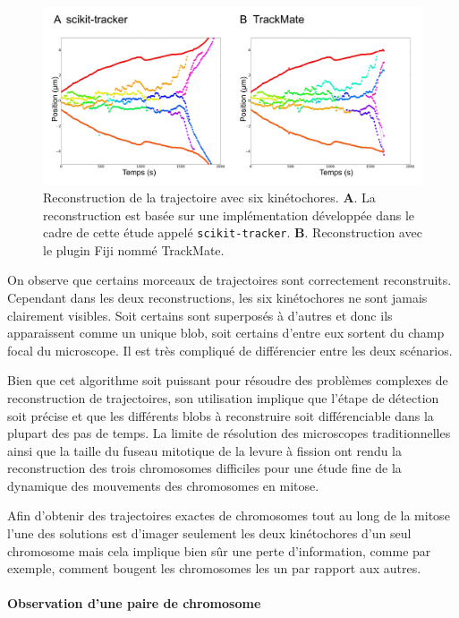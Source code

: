 \documentclass[12pt,a4paper,twoside,openright]{book}
\let\oldparagraph\paragraph
\renewcommand{\paragraph}[1]{\oldparagraph{#1}\mbox{}}
\begin{document}
\begin{figure}[htbp]
\centering
\includegraphics{figures/results/imaging/ndc80.png}
\caption[Reconstruction de la trajectoire avec six kinétochores]{\label{fig:ndc80-reconstruction}Reconstruction
de la trajectoire avec six kinétochores. \textbf{A}. La reconstruction
est basée sur une implémentation développée dans le cadre de cette étude
appelé \texttt{scikit-tracker}. \textbf{B}. Reconstruction avec le
plugin Fiji nommé TrackMate.}
\end{figure}

On observe que certains morceaux de trajectoires sont correctement
reconstruits. Cependant dans les deux reconstructions, les six
kinétochores ne sont jamais clairement visibles. Soit certains sont
superposés à d'autres et donc ils apparaissent comme un unique blob,
soit certains d'entre eux sortent du champ focal du microscope. Il est
très compliqué de différencier entre les deux scénarios.

Bien que cet algorithme soit puissant pour résoudre des problèmes
complexes de reconstruction de trajectoires, son utilisation implique
que l'étape de détection soit précise et que les différents blobs à
reconstruire soit différenciable dans la plupart des pas de temps. La
limite de résolution des microscopes traditionnelles ainsi que la taille
du fuseau mitotique de la levure à fission ont rendu la reconstruction
des trois chromosomes difficiles pour une étude fine de la dynamique des
mouvements des chromosomes en mitose.

Afin d'obtenir des trajectoires exactes de chromosomes tout au long de
la mitose l'une des solutions est d'imager seulement les deux
kinétochores d'un seul chromosome mais cela implique bien sûr une perte
d'information, comme par exemple, comment bougent les chromosomes les un
par rapport aux autres.

\paragraph{Observation d'une paire de
chromosome}\label{observation-dune-paire-de-chromosome}
\end{document}
